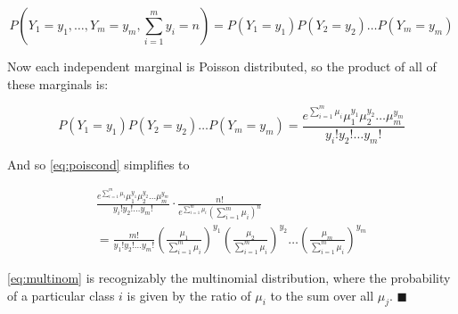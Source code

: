 $$P \left (Y_1 = y_1, \dots, Y_m = y_m, \sum_{i=1}^m y_i = n \right ) = P(Y_1 = y_1) P(Y_2 = y_2) \dots P(Y_m = y_m)$$

Now each independent marginal is Poisson distributed, so the product of all of these marginals is:

$$P(Y_1 = y_1) P(Y_2 = y_2) \dots P(Y_m = y_m) =  \frac{e^{\sum_{i=1}^m \mu_i} \mu_1^{y_1} \mu_2^{y_2} \dots \mu_m^{y_m}}{y_i!
  y_2! \dots y_m!}$$

And so \ref{eq:poiscond} simplifies to

\begin{equation}
  \label{eq:multinom}
\begin{split}
  \frac{e^{\sum_{i=1}^m \mu_i} \mu_1^{y_1} \mu_2^{y_2} \dots \mu_m^{y_m}}{y_i! y_2! \dots y_m!} \cdot \frac{n!}{e^{\sum_{i=1}^m
      \mu_i} (\sum_{i=1}^m \mu_i)^n} \\
  = \frac{m!}{y_1! y_2! \dots y_m!} \left (\frac{\mu_1}{\sum_{i=1}^m \mu_i} \right )^{y_1} \left (\frac{\mu_2}{\sum_{i=1}^m \mu_i}
    \right )^{y_2} \dots \left (\frac{\mu_m}{\sum_{i=1}^m \mu_i} \right )^{y_m}
  \end{split}
\end{equation}

\ref{eq:multinom} is recognizably the multinomial distribution, where the probability of a particular class $i$ is given by the
ratio of $\mu_i$ to the sum over all $\mu_j$. $\blacksquare$
  
